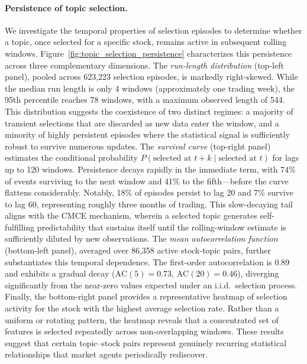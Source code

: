 \documentclass[11pt]{article}
\begin{document}
\paragraph{Persistence of topic selection.}

We investigate the temporal properties of selection episodes to determine whether a topic, once selected for a specific stock, remains active in subsequent rolling windows.
Figure~\ref{fig:topic_selection_persistence} characterizes this persistence across three complementary dimensions.
The \emph{run-length distribution} (top-left panel), pooled across 623,223 selection episodes, is markedly right-skewed.
While the median run length is only 4 windows (approximately one trading week), the 95th percentile reaches 78 windows, with a maximum observed length of 544.
This distribution suggests the coexistence of two distinct regimes: a majority of transient selections that are discarded as new data enter the window, and a minority of highly persistent episodes where the statistical signal is sufficiently robust to survive numerous updates.
The \emph{survival curve} (top-right panel) estimates the conditional probability $P(\text{selected at } t+k \mid \text{selected at } t)$ for lags up to 120 windows.
Persistence decays rapidly in the immediate term, with 74\% of events surviving to the next window and 41\% to the fifth—before the curve flattens considerably.
Notably, 18\% of episodes persist to lag 20 and 7\% survive to lag 60, representing roughly three months of trading.
This slow-decaying tail aligns with the CMCE mechanism, wherein a selected topic generates self-fulfilling predictability that sustains itself until the rolling-window estimate is sufficiently diluted by new observations.
The \emph{mean autocorrelation function} (bottom-left panel), averaged over 86,358 active stock-topic pairs, further substantiates this temporal dependence.
The first-order autocorrelation is 0.89 and exhibits a gradual decay ($\text{AC}(5) = 0.73$, $\text{AC}(20) = 0.46$), diverging significantly from the near-zero values expected under an i.i.d.\ selection process.
Finally, the bottom-right panel provides a representative heatmap of selection activity for the stock with the highest average selection rate.
Rather than a uniform or rotating pattern, the heatmap reveals that a concentrated set of features is selected repeatedly across non-overlapping windows.
These results suggest that certain topic--stock pairs represent genuinely recurring statistical relationships that market agents periodically rediscover.
\end{document}

